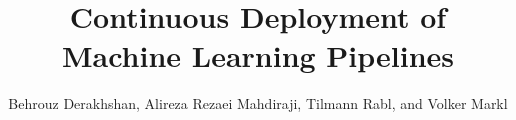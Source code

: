\documentclass[sigconf,edbt]{acmart-edbt2019}
\begin{document}
%

\title{Continuous Deployment of Machine Learning Pipelines}

\author{Behrouz Derakhshan, Alireza Rezaei Mahdiraji, Tilmann Rabl, and Volker Markl\\ }
%
%
%



\maketitle




%







{\fontsize{8}{4}\selectfont }
\end{document}
